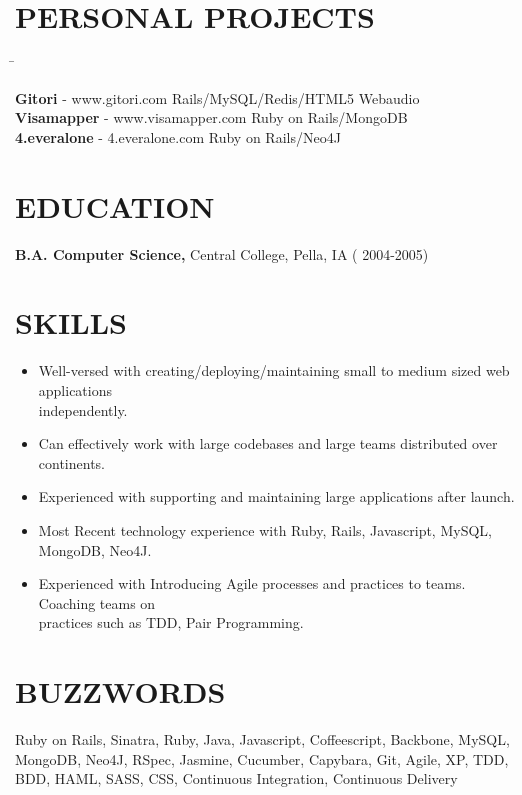 \documentclass{res}
\begin{document}
\begin{resume}
\section{PERSONAL PROJECTS}  \vspace{-0.01in}   
   \begin{tabbing}
   \hspace{3.3in}\= \kill %

    {\bf Gitori} - www.gitori.com   \>Rails/MySQL/Redis/HTML5 Webaudio \\

    {\bf Visamapper} - www.visamapper.com   \>Ruby on Rails/MongoDB \\
 
    {\bf 4.everalone} - 4.everalone.com \>Ruby on Rails/Neo4J \\
\end{tabbing}

\section{EDUCATION}\vspace{0.2in}
    {\bf B.A. Computer Science,} Central College, Pella, IA
   ( 2004-2005)


\section{SKILLS} \vspace{0.3in}         
 \begin{itemize} \itemsep 0pt  
 \setlength{\itemindent}{-1.8em}
\item Well-versed with creating/deploying/maintaining small to medium sized web applications\\ independently.
\item Can effectively work with large codebases and large teams distributed over continents.
\item Experienced with supporting and maintaining large applications after launch.
\item Most Recent technology experience with Ruby, Rails, Javascript, MySQL, MongoDB, Neo4J. 
\item Experienced with Introducing Agile processes and practices to teams. Coaching teams on \\practices such as TDD, Pair Programming.

 \end{itemize}


\section{BUZZWORDS}\vspace{0.2in}
Ruby on Rails, Sinatra, Ruby, Java, Javascript, Coffeescript, Backbone, MySQL, MongoDB, Neo4J, RSpec, Jasmine, Cucumber, Capybara, Git, Agile, XP, TDD, BDD, HAML, SASS, CSS, Continuous Integration, Continuous Delivery 
 
\end{resume}
\end{document}
